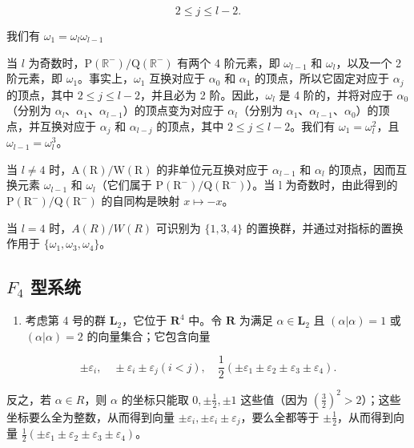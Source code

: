 \[
2 \leqslant j \leqslant l - 2.
\]

我们有 \(\omega_{1} = \omega_{l}\omega_{l - 1}\)

当 \(l\) 为奇数时，\(\mathrm{P}(\mathbb{R}^{-}) / \mathrm{Q}(\mathbb{R}^{-})\) 有两个 4 阶元素，即 \(\omega_{l-1}\) 和 \(\omega_l\)，以及一个 2 阶元素，即 \(\omega_1\)。事实上，\(\omega_1\) 互换对应于 \(\alpha_0\) 和 \(\alpha_1\) 的顶点，所以它固定对应于 \(\alpha_j\) 的顶点，其中 \(2 \leqslant j \leqslant l-2\)，并且必为 2 阶。因此，\(\omega_l\) 是 4 阶的，并将对应于 \(\alpha_0\)（分别为 \(\alpha_l\)、\(\alpha_1\)、\(\alpha_{l-1}\)）的顶点变为对应于 \(\alpha_l\)（分别为 \(\alpha_1\)、\(\alpha_{l-1}\)、\(\alpha_0\)）的顶点，并互换对应于 \(\alpha_j\) 和 \(\alpha_{l-j}\) 的顶点，其中 \(2 \leqslant j \leqslant l-2\)。我们有 \(\omega_1 = \omega_l^2\)，且 \(\omega_{l-1} = \omega_l^3\)。

当 \(l \neq 4\) 时，\(\mathrm{A}(\mathrm{R})/\mathrm{W}(\mathrm{R})\) 的非单位元互换对应于 \(\alpha_{l-1}\) 和 \(\alpha_{l}\) 的顶点，因而互换元素 \(\omega_{l-1}\) 和 \(\omega_{l}\)（它们属于 \(\mathrm{P}(\mathrm{R}^{-})/\mathrm{Q}(\mathrm{R}^{-})\)）。当 l 为奇数时，由此得到的 \(\mathrm{P}(\mathrm{R}^{-})/\mathrm{Q}(\mathrm{R}^{-})\) 的自同构是映射 \(x \mapsto -x\)。

当 \(l = 4\) 时，\(A(R)/W(R)\) 可识别为 \(\{1,3,4\}\) 的置换群，并通过对指标的置换作用于 \(\{\omega_1,\omega_3,\omega_4\}\)。

\subsection{\texorpdfstring{\(F_{4}\) 型系统}{F\_4 型系统}}

\begin{enumerate}
\def\labelenumi{(\Roman{enumi})}
\tightlist
\item
  考虑第 4 号的群 \(\mathbf{L}_2\)，它位于 \(\mathbf{R}^4\) 中。令 \(\mathbf{R}\) 为满足 \(\alpha \in \mathbf{L}_2\) 且 \((\alpha |\alpha) = 1\) 或 \((\alpha |\alpha) = 2\) 的向量集合；它包含向量
\end{enumerate}

\[
\pm \varepsilon_ {i}, \quad \pm \varepsilon_ {i} \pm \varepsilon_ {j} (i <   j), \quad \frac {1}{2} (\pm \varepsilon_ {1} \pm \varepsilon_ {2} \pm \varepsilon_ {3} \pm \varepsilon_ {4}).
\]

反之，若 \(\alpha\in R\)，则 \(\alpha\) 的坐标只能取 \(0,\pm\frac{1}{2},\pm1\) 这些值（因为 \((\frac{3}{2})^{2}>2\)）；这些坐标要么全为整数，从而得到向量 \(\pm\varepsilon_{i},\pm\varepsilon_{i}\pm\varepsilon_{j}\)，要么全都等于 \(\pm\frac{1}{2}\)，从而得到向量 \(\frac{1}{2}(\pm\varepsilon_{1}\pm\varepsilon_{2}\pm\varepsilon_{3}\pm\varepsilon_{4})\)。

